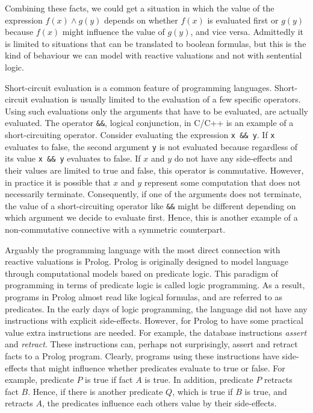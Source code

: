 \documentclass[a4paper,twoside,openright]{report}
\begin{document}
Combining these facts, we could get a situation in which the value of the expression $f(x)\wedge g(y)$ depends on whether $f(x)$ is evaluated first or $g(y)$ because $f(x)$ might influence the value of $g(y)$, and vice versa. Admittedly it is limited to situations that can be translated to boolean formulas, but this is the kind of behaviour we can model with reactive valuations and not with sentential logic.

Short-circuit evaluation is a common feature of programming languages. Short-circuit evaluation is usually limited to the evaluation of a few specific operators. Using such evaluations only the arguments that have to be evaluated, are actually evaluated. The operator \verb+&&+, logical conjunction, in C/C++ is an example of a short-circuiting operator. Consider evaluating the expression \verb+x && y+. If \verb+x+ evaluates to false, the second argument \verb+y+ is not evaluated because regardless of its value \verb+x && y+ evaluates to false. If $x$ and $y$ do not have any side-effects and their values are limited to true and false, this operator is commutative. However, in practice it is possible that $x$ and $y$ represent some computation that does not necessarily terminate. Consequently, if one of the arguments does not terminate, the value of a short-circuiting operator like \verb+&&+ might be different depending on which argument we decide to evaluate first. Hence, this is another example of a non-commutative connective with a symmetric counterpart.

Arguably the programming language with the most direct connection with reactive valuations is Prolog. Prolog is originally designed to model language through computational models based on predicate logic. This paradigm of programming in terms of predicate logic is called logic programming. As a result, programs in Prolog almost read like logical formulas, and are referred to as predicates. In the early days of logic programming, the language did not have any instructions with explicit side-effects. However, for Prolog to have some practical value extra instructions are needed. For example, the database instructions \emph{assert} and \emph{retract}. These instructions can, perhaps not surprisingly, assert and retract facts to a Prolog program. Clearly, programs using these instructions have side-effects that might influence whether predicates evaluate to true or false. For example, predicate $P$ is true if fact $A$ is true. In addition, predicate $P$ retracts fact $B$. Hence, if there is another predicate $Q$, which is true if $B$ is true, and retracts $A$, the predicates influence each others value by their side-effects.
\end{document}
